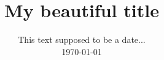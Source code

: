 \documentclass{article}
\title{My beautiful title}
\date{This text supposed to be a date...\\ \today}
\begin{document}
\maketitle{}
\end{document}
